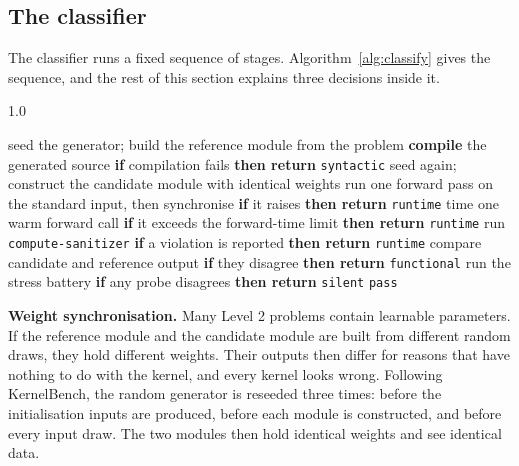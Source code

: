 \documentclass[12pt]{article}
\begin{document}
\subsection{The classifier}
\label{sec:classifier}

The classifier runs a fixed sequence of stages. Algorithm~\ref{alg:classify}
gives the sequence, and the rest of this section explains three decisions
inside it.

\begin{algorithm}[H]
\caption{Classifying one generated kernel}
\label{alg:classify}
\begin{spacing}{1.0}
\begin{algorithmic}[1]
\State seed the generator; build the reference module from the problem
\State \textbf{compile} the generated source 
\State \textbf{if} compilation fails \textbf{then return} \texttt{syntactic}
\State seed again; construct the candidate module with identical weights
\State run one forward pass on the standard input, then synchronise
\State \textbf{if} it raises \textbf{then return} \texttt{runtime}
\State time one warm forward call 
\State \textbf{if} it exceeds the forward-time limit \textbf{then return} \texttt{runtime}
\State run \texttt{compute-sanitizer} 
\State \textbf{if} a violation is reported \textbf{then return} \texttt{runtime}
\State compare candidate and reference output 
\State \textbf{if} they disagree \textbf{then return} \texttt{functional}
\State run the stress battery 
\State \textbf{if} any probe disagrees \textbf{then return} \texttt{silent}
\State \Return \texttt{pass}
\end{algorithmic}
\end{spacing}
\end{algorithm}

\textbf{Weight synchronisation.} Many Level 2 problems contain learnable
parameters. If the reference module and the candidate module are built from
different random draws, they hold different weights. Their outputs then differ
for reasons that have nothing to do with the kernel, and every kernel looks
wrong. Following KernelBench, the random generator is reseeded three times: before
the initialisation inputs are produced, before each module is constructed, and
before every input draw. The two modules then hold identical weights and see
identical data.
\end{document}
